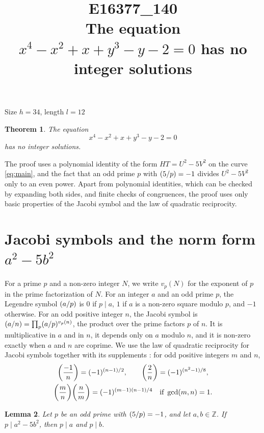 \documentclass[11pt]{article}
\title{\textbf{E16377\_140}\\[4pt] {\Large The equation $x^{4}-x^{2}+x+y^{3}-y-2=0$ has no integer solutions}}
\author{}
\date{}
\newtheorem{theorem}{Theorem}
\newtheorem{lemma}[theorem]{Lemma}
\newcommand{\Z}{\mathbb{Z}}
\newcommand{\leg}[2]{\mathchoice{\biggl(\dfrac{#1}{#2}\biggr)}{(#1/#2)}{(#1/#2)}{(#1/#2)}}
\begin{document}
\maketitle
\vspace{-8ex}
\begin{center}
Size $h=34$, length $l=12$
\end{center}

\begin{theorem}\label{thm:main}
The equation
\begin{equation}\label{eq:main}
x^{4}-x^{2}+x+y^{3}-y-2=0
\end{equation}
has no integer solutions.
\end{theorem}

The proof uses a polynomial identity of the form $HT=U^2-5V^2$ on the curve \eqref{eq:main}, and the fact that an odd prime $p$ with $\leg{5}{p}=-1$ divides $U^2-5V^2$ only to an even power. Apart from polynomial identities, which can be checked by expanding both sides, and finite checks of congruences, the proof uses only basic properties of the Jacobi symbol and the law of quadratic reciprocity.

\section{\texorpdfstring{Jacobi symbols and the norm form $a^2-5b^2$}{Jacobi symbols and the norm form}}

For a prime $p$ and a non-zero integer $N$, we write $v_p(N)$ for the exponent of $p$ in the prime factorization of $N$. For an integer $a$ and an odd prime $p$, the Legendre symbol $\leg{a}{p}$ is $0$ if $p\mid a$, $1$ if $a$ is a non-zero square modulo $p$, and $-1$ otherwise. For an odd positive integer $n$, the Jacobi symbol is $\leg{a}{n}=\prod_p\leg{a}{p}^{v_p(n)}$, the product over the prime factors $p$ of $n$. It is multiplicative in $a$ and in $n$, it depends only on $a$ modulo $n$, and it is non-zero exactly when $a$ and $n$ are coprime. We use the law of quadratic reciprocity for Jacobi symbols together with its supplements \cite[Chapter~5, \S2]{IR}: for odd positive integers $m$ and $n$,
\begin{gather*}
\leg{-1}{n}=(-1)^{(n-1)/2},\qquad\leg{2}{n}=(-1)^{(n^2-1)/8},\\
\leg{m}{n}\leg{n}{m}=(-1)^{(m-1)(n-1)/4}\quad\text{if }\gcd(m,n)=1.
\end{gather*}

\begin{lemma}\label{lem:divides}
Let $p$ be an odd prime with $\leg{5}{p}=-1$, and let $a,b\in\Z$. If $p\mid a^2-5b^2$, then $p\mid a$ and $p\mid b$.
\end{lemma}
\end{document}
